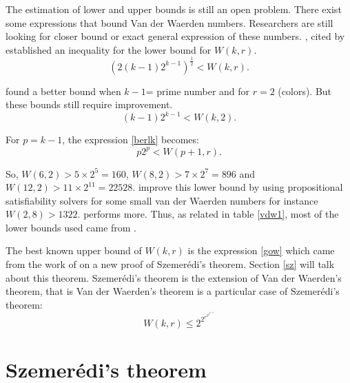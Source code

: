 The estimation of lower and upper bounds is still an open problem. There exist some expressions that bound Van der Waerden numbers.  Researchers are still looking for closer bound or exact general expression of these numbers.
 \cite{erdos1952combinatorial}, cited by \cite{dransfield2004} established an inequality for the lower bound for $W(k,r).$
\begin{equation}
(2(k-1)2^{k-1})^{\frac{1}{2}} < W(k,r). \label{erdos}
\end{equation}

\cite{brk1968} found a better bound when $k-1$= prime number  and for $r=2$ (colors). But these bounds still  require improvement. 
 \begin{equation}
 (k-1)2^{k-1}<W(k,2). \label{berlk}
 \end{equation}

For $p=k-1$, the expression \eqref{berlk} becomes:
 \begin{equation}
 p2^{p}<W(p+1,r). \label{berlk1}
\end{equation}

So, $W(6,2) >5 \times 2^5=160$, $W(8,2) >7 \times 2^7= 896$ and $W(12,2) >11 \times 2^11= 22528.$
\citep{dransfield2004} improve this lower bound by using propositional satisfiability solvers  for some small van der Waerden numbers for instance $W(2, 8) > 1322$. \cite{rabung2012} performs more. Thus, as related in table \eqref{vdw1}, most of the lower bounds used came from \cite{rabung2012}.

The best known upper bound of $W(k,r)$ is the expression  \eqref{gow} which came from the work of \cite{gowers2001new} on a  new proof of Szemerédi's theorem. Section \eqref{sz} will talk about this theorem. Szemerédi's theorem is the extension of Van der Waerden's theorem, that is Van der Waerden's theorem is a particular case of Szemerédi's theorem:
\begin{equation}
W(k,r) \leq 2^{2^{r^{2^{2^{k+9}}}}}     \label{gow}
\end{equation}



\section{Szemerédi's theorem} \label{sz}


